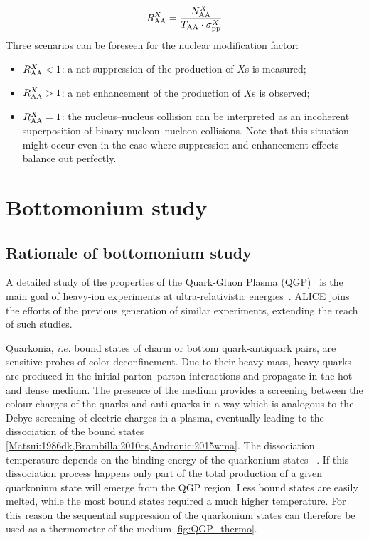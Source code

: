 \begin{equation}
\label{eq:RAA2}
R_{\rm{AA}}^X = \frac{N_{\rm{AA}}^X}{T_{\rm{AA}} \cdot \sigma_{\rm{pp}}^X}
\end{equation}
Three scenarios can be foreseen for the nuclear modification factor:
\begin{itemize}
\item $R_{\rm{AA}}^X<1$: a net suppression of the production of $X$s is measured;
\item $R_{\rm{AA}}^X>1$: a net enhancement of the production of $X$s is observed; 
\item $R_{\rm{AA}}^X=1$: the nucleus--nucleus collision can be interpreted as an incoherent superposition of binary nucleon--nucleon collisions. Note that this situation might occur even in the case where suppression and enhancement effects balance out perfectly.
\end{itemize}

\section{Bottomonium study}
\subsection{Rationale of bottomonium study} %
A detailed study of the properties of the Quark-Gluon Plasma (QGP)~\cite{Shuryak:1978ij} is the main goal of heavy-ion experiments at ultra-relativistic energies~\cite{Adams:2005dq,Muller:2012zq}.
ALICE joins the efforts of the previous generation of similar experiments, extending the reach of such studies.

Quarkonia, $i.e.$ bound states of charm or bottom quark-antiquark pairs, are sensitive probes of color deconfinement. 
Due to their heavy mass, heavy quarks are produced in the initial parton--parton interactions and propagate in the hot and dense medium.
The presence of the medium provides a screening between the colour charges of the quarks and anti-quarks in a way which is analogous to the Debye screening of electric charges in a plasma, eventually leading to the dissociation of the bound states \ref{Matsui:1986dk,Brambilla:2010cs,Andronic:2015wma}.
The dissociation temperature depends on the binding energy of the quarkonium states ~\cite{Digal:2001ue}. 
If this dissociation process happens only part of the total production of a given quarkonium state will emerge from the QGP region.
Less bound states are easily melted, while the most bound states required a much higher temperature.
For this reason the sequential suppression of the quarkonium states can therefore be used as a thermometer of the medium \ref{fig:QGP_thermo}.

